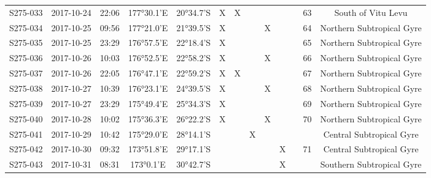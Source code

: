 \begin{longtable}{ccccccccccccc}
  S275-033 & 2017-10-24 & 22:06 & 177°30.1'E & 20°34.7'S & X & X &  &  &  &  & 63 & South of Vitu Levu  \\ 
  S275-034 & 2017-10-25 & 09:56 & 177°21.0'E & 21°39.5'S & X &  &  & X &  &  & 64 & Northern Subtropical Gyre  \\ 
  S275-035 & 2017-10-25 & 23:29 & 176°57.5'E & 22°18.4'S & X &  &  &  &  &  & 65 & Northern Subtropical Gyre  \\ 
  S275-036 & 2017-10-26 & 10:03 & 176°52.5'E & 22°58.2'S & X &  &  & X &  &  & 66 & Northern Subtropical Gyre  \\ 
  S275-037 & 2017-10-26 & 22:05 & 176°47.1'E & 22°59.2'S & X & X &  &  &  &  & 67 & Northern Subtropical Gyre  \\ 
  S275-038 & 2017-10-27 & 10:39 & 176°23.1'E & 24°39.5'S & X &  &  & X &  &  & 68 & Northern Subtropical Gyre  \\ 
  S275-039 & 2017-10-27 & 23:29 & 175°49.4'E & 25°34.3'S & X &  &  &  &  &  & 69 & Northern Subtropical Gyre  \\ 
  S275-040 & 2017-10-28 & 10:02 & 175°36.3'E & 26°22.2'S & X &  &  & X &  &  & 70 & Northern Subtropical Gyre  \\ 
  S275-041 & 2017-10-29 & 10:42 & 175°29.0'E & 28°14.1'S &  &  & X &  &  &  &  & Central Subtropical Gyre \\ 
  S275-042 & 2017-10-30 & 09:32 & 173°51.8'E & 29°17.1'S &  &  &  &  & X &  & 71 & Central Subtropical Gyre \\ 
  S275-043 & 2017-10-31 & 08:31 & 173°0.1'E & 30°42.7'S &  &  &  &  & X &  &  & Southern Subtropical Gyre \\ 
  \hline
\end{longtable}

